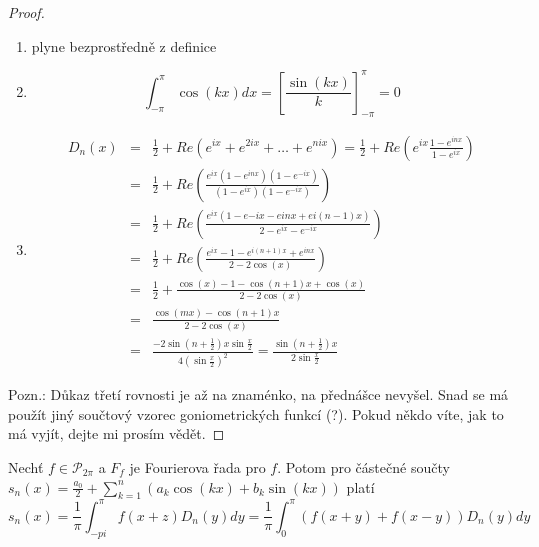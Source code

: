 \begin{proof}
\begin{enumerate}
\item plyne bezprostředně z definice
\item $$\int_{-\pi}^\pi \cos(kx) dx = \left[ \frac{\sin(kx)}{k} \right]_{-\pi}^\pi = 0$$
\item
\begin{eqnarray*}
D_n(x) & = & \frac{1}{2} + Re \left( e^{ix} + e^{2ix} + \ldots + e^{nix} \right) = \frac{1}{2} + Re \left( e^{ix} \frac{1-e^{inx}}{1-e^{ix}} \right) \\
& = & \frac{1}{2} + Re \left( \frac{e^{ix} \left( 1-e^{inx} \right) \left( 1-e^{-ix} \right)}{\left( 1-e^{ix} \right) \left( 1-e^{-ix} \right)} \right) \\
& = & \frac{1}{2} + Re \left( \frac{e^{ix} \left( 1-e{-ix}-e{inx}+e{i(n-1)x} \right)}{2-e^{ix}-e^{-ix}} \right) \\
& = & \frac{1}{2} + Re \left( \frac{e^{ix} - 1 - e^{i(n+1)x} + e^{inx}}{2 - 2 \cos(x)} \right) \\
& = & \frac{1}{2} + \frac{\cos(x)-1-\cos(n+1)x + \cos(x)}{2-2\cos(x)} \\
& = & \frac{\cos(mx) - \cos(n+1)x}{2 - 2\cos(x)} \\
& = & \frac{-2 \sin \left( n + \frac{1}{2} \right) x \sin \frac{x}{2}}{4 \left( \sin \frac{x}{2} \right)^{2}} = \frac{\sin \left(n + \frac{1}{2} \right) x}{2 \sin \frac{x}{2}} 
\end{eqnarray*}
\end{enumerate}

Pozn.: Důkaz třetí rovnosti je až na znaménko, na přednášce nevyšel. Snad se má použít jiný součtový vzorec goniometrických funkcí (?). Pokud někdo víte, jak to má vyjít, dejte mi prosím vědět.
\end{proof}

\begin{vetal}
Nechť $f \in \mathcal{P}_{2 \pi}$ a $F_f$ je Fourierova řada pro $f$. Potom pro částečné součty $s_n(x) = \frac{a_0}{2} + \sum_{k=1}^{n} (a_k \cos ( kx) + b_k \sin ( kx ))$ platí
$$s_n(x) = \frac{1}{\pi} \int_{-pi}^\pi f(x+z)D_n(y)dy = \frac{1}{\pi} \int_0^\pi \left( f(x+y) + f(x-y) \right) D_n(y) dy$$
\end{vetal}

